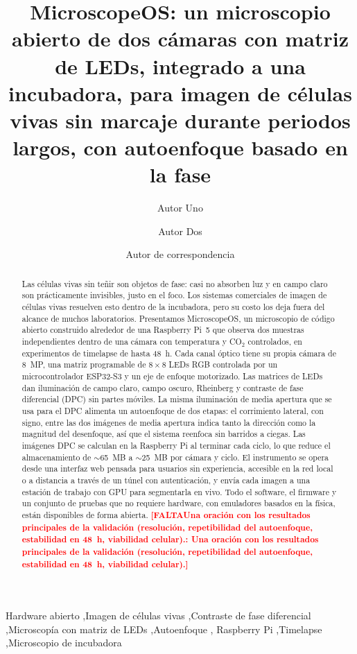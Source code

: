 \documentclass[preprint,12pt]{elsarticle}
\DeclareRobustCommand{\TODO}[1]{\textcolor{red}{\textbf{[FALTA\ifx\relax#1\relax\else: #1\fi]}}}
\begin{document}
\begin{frontmatter}

\title{MicroscopeOS: un microscopio abierto de dos cámaras con matriz de
LEDs, integrado a una incubadora, para imagen de células vivas sin marcaje
durante periodos largos, con autoenfoque basado en la fase}

\author[uanl]{Autor Uno}
\author[uanl]{Autor Dos}
\author[uanl]{Autor de correspondencia}
\address[uanl]{Laboratorio, Facultad, Universidad Autónoma de Nuevo León,
  Ciudad, Nuevo León, México}

\begin{abstract}
Las células vivas sin teñir son objetos de fase: casi no absorben luz y en
campo claro son prácticamente invisibles, justo en el foco. Los sistemas
comerciales de imagen de células vivas resuelven esto dentro de la
incubadora, pero su costo los deja fuera del alcance de muchos
laboratorios. Presentamos MicroscopeOS, un microscopio de código abierto
construido alrededor de una Raspberry Pi~5 que observa dos muestras
independientes dentro de una cámara con temperatura y CO$_2$ controlados,
en experimentos de timelapse de hasta 48~h. Cada canal óptico tiene su
propia cámara de 8~MP, una matriz programable de $8\times8$ LEDs RGB
controlada por un microcontrolador ESP32-S3 y un eje de enfoque motorizado.
Las matrices de LEDs dan iluminación de campo claro, campo oscuro,
Rheinberg y contraste de fase diferencial (DPC) sin partes móviles. La
misma iluminación de media apertura que se usa para el DPC alimenta un
autoenfoque de dos etapas: el corrimiento lateral, con signo, entre las dos
imágenes de media apertura indica tanto la dirección como la magnitud del
desenfoque, así que el sistema reenfoca sin barridos a ciegas. Las
imágenes DPC se calculan en la Raspberry Pi al terminar cada ciclo, lo que
reduce el almacenamiento de $\sim$65~MB a $\sim$25~MB por cámara y ciclo.
El instrumento se opera desde una interfaz web pensada para usuarios sin
experiencia, accesible en la red local o a distancia a través de un túnel
con autenticación, y envía cada imagen a una estación de trabajo con GPU
para segmentarla en vivo. Todo el software, el firmware y un conjunto de
pruebas que no requiere hardware, con emuladores basados en la física,
están disponibles de forma abierta. \TODO{Una oración con los resultados
principales de la validación (resolución, repetibilidad del autoenfoque,
estabilidad en 48~h, viabilidad celular).}
\end{abstract}

\begin{keyword}
Hardware abierto \sep Imagen de células vivas \sep Contraste de fase
diferencial \sep Microscopía con matriz de LEDs \sep Autoenfoque \sep
Raspberry Pi \sep Timelapse \sep Microscopio de incubadora
\end{keyword}

\end{frontmatter}
\end{document}
